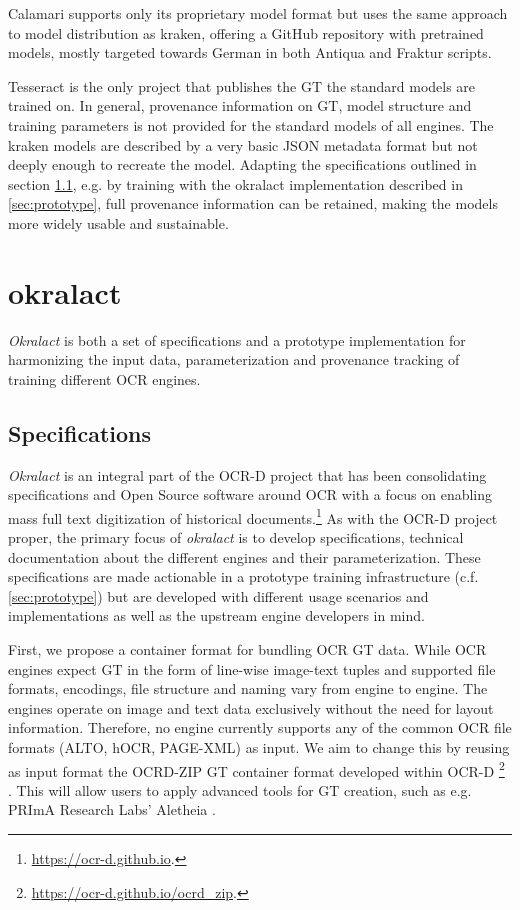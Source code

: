 \documentclass[sigconf]{acmart}
\begin{document}
Calamari supports only its proprietary model format but uses the same approach
to model distribution as kraken, offering a GitHub repository with pretrained
models, mostly targeted towards German in both Antiqua and Fraktur scripts.


Tesseract is the only project that publishes the GT the standard models are
trained on. In general, provenance information on GT, model structure and training 
parameters is not provided for the standard models of all engines.
The kraken models are described by a very basic JSON metadata format but not
deeply enough to recreate the model. Adapting the specifications outlined
in section \ref{sec:specs}, e.g. by training with the okralact implementation
described in \ref{sec:prototype}, full provenance information can be retained,
making the models more widely usable and sustainable.


\section{okralact}


\textit{Okralact} is both a set of specifications and a prototype
implementation for harmonizing the input data, parameterization and
provenance tracking of training different OCR engines.

\subsection{Specifications}
\label{sec:specs}

\textit{Okralact} is an integral part of the OCR-D project that has been
consolidating specifications and Open Source software around OCR
with a focus on enabling mass full text digitization of historical
documents.\footnote{\url{https://ocr-d.github.io}.} As with the
OCR-D project proper, the primary focus of \textit{okralact} is to develop
specifications, technical documentation about the different engines
and their parameterization. These specifications are made
actionable in a prototype training infrastructure (c.f.
\ref{sec:prototype}) but are developed with different usage
scenarios and implementations as well as the upstream engine
developers in mind.

First, we propose a container format for bundling OCR GT data.
While OCR engines expect GT in the form of line-wise image-text
tuples and supported file formats, encodings, file structure and
naming vary from engine to engine. The engines operate on image and
text data exclusively without the need for layout information.
Therefore, no engine currently supports any of the common OCR file
formats (ALTO, hOCR, PAGE-XML) as input. We aim to change this by
reusing as input format the OCRD-ZIP GT container format developed
within OCR-D \footnote{\url{https://ocr-d.github.io/ocrd_zip}.}
\cite{boenig2019datech}. This will allow users to apply advanced
tools for GT creation, such as e.g.  PRImA Research Labs' Aletheia
\cite{clausner2011aletheia}.
\end{document}
